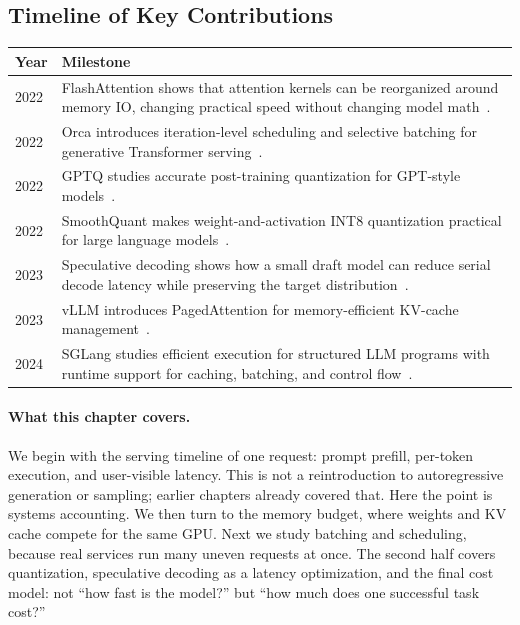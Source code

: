 \subsection*{Timeline of Key Contributions}

\begin{center}
\begin{tabularx}{\textwidth}{@{}lX@{}}
\toprule
\textbf{Year} & \textbf{Milestone} \\
\midrule
2022 & FlashAttention shows that attention kernels can be reorganized around memory IO, changing practical speed without changing model math~\cite{dao2022flashattention}. \\
2022 & Orca introduces iteration-level scheduling and selective batching for generative Transformer serving~\cite{yu2022orca}. \\
2022 & GPTQ studies accurate post-training quantization for GPT-style models~\cite{frantar2022gptq}. \\
2022 & SmoothQuant makes weight-and-activation INT8 quantization practical for large language models~\cite{xiao2023smoothquant}. \\
2023 & Speculative decoding shows how a small draft model can reduce serial decode latency while preserving the target distribution~\cite{leviathan2023speculative}. \\
2023 & vLLM introduces PagedAttention for memory-efficient KV-cache management~\cite{kwon2023pagedattention}. \\
2024 & SGLang studies efficient execution for structured LLM programs with runtime support for caching, batching, and control flow~\cite{zheng2024sglang}. \\
\bottomrule
\end{tabularx}
\end{center}

\paragraph{What this chapter covers.} We begin with the serving timeline of one request: prompt prefill, per-token execution, and user-visible latency. This is not a reintroduction to autoregressive generation or sampling; earlier chapters already covered that. Here the point is systems accounting. We then turn to the memory budget, where weights and KV cache compete for the same GPU. Next we study batching and scheduling, because real services run many uneven requests at once. The second half covers quantization, speculative decoding as a latency optimization, and the final cost model: not ``how fast is the model?'' but ``how much does one successful task cost?''


